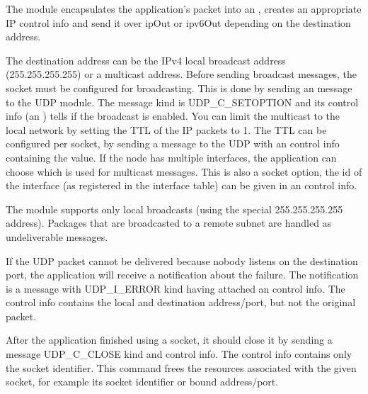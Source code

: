 The  module encapsulates the application's packet into an ,
creates an appropriate IP control info and send it over ipOut or ipv6Out depending on
the destination address.

The destination address can be the IPv4 local broadcast address (255.255.255.255)
or a multicast address. Before sending broadcast messages, the socket must be configured
for broadcasting. This is done by sending an message to the UDP module. The message
kind is UDP\_C\_SETOPTION and its control info (an )
tells if the broadcast is enabled. You can limit the multicast to the local network
by setting the TTL of the IP packets to 1. The TTL can be configured per socket,
by sending a message to the UDP with an  control info
containing the value. If the node has multiple interfaces, the application can
choose which is used for multicast messages. This is also a socket option, the
id of the interface (as registered in the interface table) can be given in an
 control info.



\begin{note}
The  module supports only local broadcasts (using the special 255.255.255.255 address).
Packages that are broadcasted to a remote subnet are handled as undeliverable messages.
\end{note}

If the UDP packet cannot be delivered because nobody listens on the destination port,
the application will receive a notification about the failure. The notification is
a message with UDP\_I\_ERROR kind having attached an 
control info. The control info contains the local and destination address/port,
but not the original packet.

After the application finished using a socket, it should close it by sending a message
UDP\_C\_CLOSE kind and  control info. The control info
contains only the socket identifier. This command frees the resources associated
with the given socket, for example its socket identifier or bound address/port.

